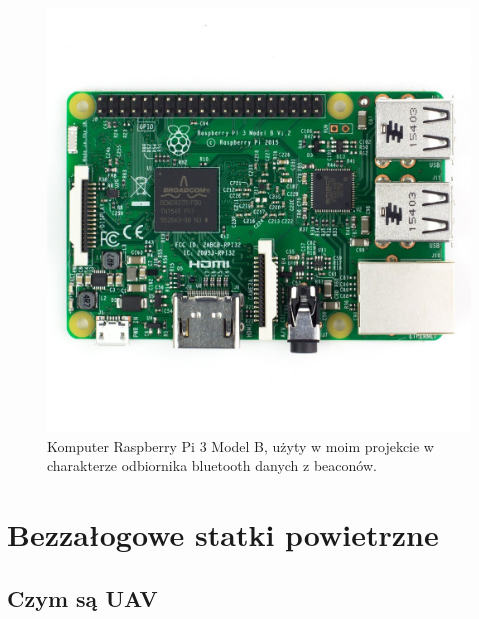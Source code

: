 \begin{figure}[!th]
    \centering
    \includegraphics[width=15cm]{zalaczniki/obrazy/raspberrypi3.jpg}
    \caption{Komputer Raspberry Pi 3 Model B, użyty w moim projekcie w charakterze odbiornika bluetooth danych z beaconów.}
    \label{fig:raspberrypi3}
\end{figure}

\section{Bezzałogowe statki powietrzne}

\subsection{Czym są UAV}

